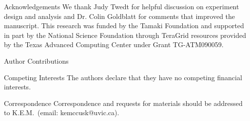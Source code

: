 \documentclass{nature}
\begin{document}



\begin{addendum}
\item[Acknowledgements] We thank Judy Twedt for helpful discussion on experiment design and analysis and Dr. Colin Goldblatt for comments that improved the manuscript. This research was funded by the Tamaki Foundation and supported in part by the National Science Foundation through TeraGrid resources provided by the Texas Advanced Computing Center under Grant TG-ATM090059.
\item[Author Contributions] 
 \item[Competing Interests] The authors declare that they have no competing financial interests.
\item[Correspondence] Correspondence and requests for materials should be addressed to K.E.M.~(email: kemccusk@uvic.ca).
\end{addendum}

\end{document}
